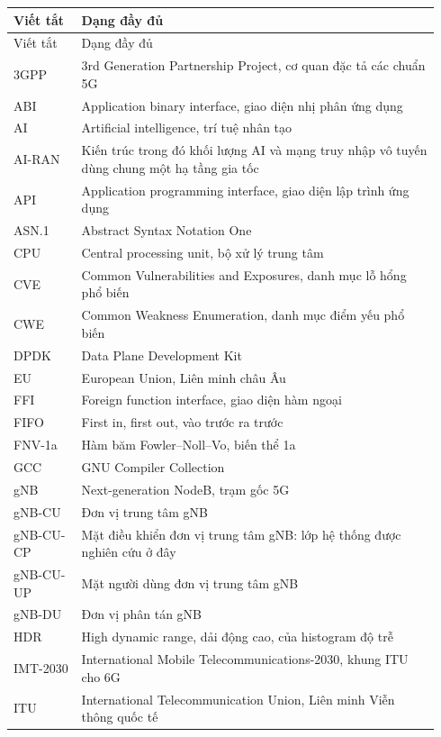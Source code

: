 \documentclass[english,oneside,a4paper,censored,csm,software-track-2020]{HYthesisML}
\begin{document}
\begingroup
\singlespacing
\footnotesize
\renewcommand{\arraystretch}{1.15}
\begin{longtable}{@{}p{0.15\linewidth} p{0.79\linewidth}@{}}
\hline\hline
Viết tắt & Dạng đầy đủ \\
\hline
\endfirsthead
\hline\hline
Viết tắt & Dạng đầy đủ \\
\hline
\endhead
3GPP & 3rd Generation Partnership Project, cơ quan đặc tả các chuẩn 5G \\
ABI & Application binary interface, giao diện nhị phân ứng dụng \\
AI & Artificial intelligence, trí tuệ nhân tạo \\
AI-RAN & Kiến trúc trong đó khối lượng AI và mạng truy nhập vô tuyến dùng chung một hạ tầng gia tốc \\
API & Application programming interface, giao diện lập trình ứng dụng \\
ASN.1 & Abstract Syntax Notation One \\
CPU & Central processing unit, bộ xử lý trung tâm \\
CVE & Common Vulnerabilities and Exposures, danh mục lỗ hổng phổ biến \\
CWE & Common Weakness Enumeration, danh mục điểm yếu phổ biến \\
DPDK & Data Plane Development Kit \\
EU & European Union, Liên minh châu Âu \\
FFI & Foreign function interface, giao diện hàm ngoại \\
FIFO & First in, first out, vào trước ra trước \\
FNV-1a & Hàm băm Fowler--Noll--Vo, biến thể 1a \\
GCC & GNU Compiler Collection \\
gNB & Next-generation NodeB, trạm gốc 5G \\
gNB-CU & Đơn vị trung tâm gNB \\
gNB-CU-CP & Mặt điều khiển đơn vị trung tâm gNB: lớp hệ thống được nghiên cứu ở đây \\
gNB-CU-UP & Mặt người dùng đơn vị trung tâm gNB \\
gNB-DU & Đơn vị phân tán gNB \\
HDR & High dynamic range, dải động cao, của histogram độ trễ \\
IMT-2030 & International Mobile Telecommunications-2030, khung ITU cho 6G \\
ITU & International Telecommunication Union, Liên minh Viễn thông quốc tế \\

\end{longtable}
\end{document}
